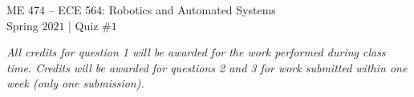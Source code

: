 \begin{center}

{\Large ME 474 -- ECE 564: Robotics and Automated Systems \\[0ex]
Spring $2021$ | Quiz $\#1$}
\end{center}

\vspace{0.1in}

\vspace{0.2in}
\noindent \textit{All credits for question 1 will be awarded for the work
performed during class time. Credits will be awarded for questions 2 and 3 for
work submitted within one week (only one submission).}




\bracketedpoints


